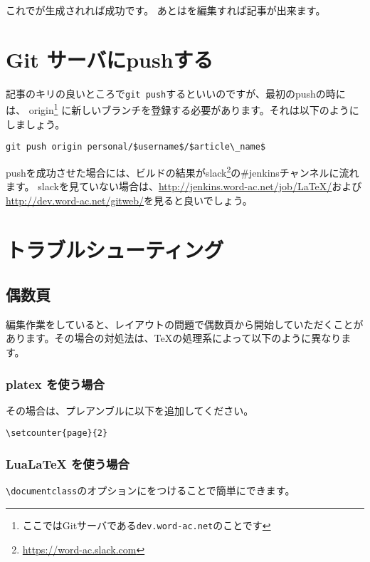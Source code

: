 これでが生成されれば成功です。
あとはを編集すれば記事が出来ます。

\section{Git サーバにpushする}

記事のキリの良いところで\lstinline|git push|するといいのですが、最初のpushの時には、
origin\footnote{ここではGitサーバである\texttt{dev.word-ac.net}のことです}%
に新しいブランチを登録する必要があります。それは以下のようにしましょう。

\begin{lstlisting}[mathescape]
git push origin personal/$username$/$article\_name$
\end{lstlisting}

pushを成功させた場合には、ビルドの結果がslack\footnote{\url{https://word-ac.slack.com}}の\#jenkinsチャンネルに流れます。
slackを見ていない場合は、\url{http://jenkins.word-ac.net/job/LaTeX/}および\url{http://dev.word-ac.net/gitweb/}を見ると良いでしょう。

\section{トラブルシューティング}

\subsection{偶数頁}

編集作業をしていると、レイアウトの問題で偶数頁から開始していただくことがあります。その場合の対処法は、\TeX の処理系によって以下のように異なります。

\subsubsection{platex を使う場合}

その場合は、プレアンブルに以下を追加してください。

\begin{lstlisting}[mathescape]
\setcounter{page}{2}
\end{lstlisting}

\subsubsection{LuaLaTeX を使う場合}

\lstinline|\documentclass|のオプションにをつけることで簡単にできます。

